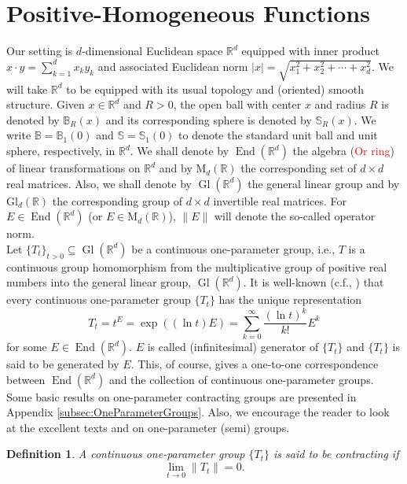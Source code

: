 \documentclass[11pt]{article}
\theoremstyle{theorem}
\newtheorem{definition}[theorem]{Definition}
\newcommand\MdR{\mbox{M}_d(\mathbb{R})} %
\newcommand\End{\operatorname{End}} %
\newcommand\GldR{\mbox{Gl}_d(\mathbb{R})}%
\newcommand\Gl{\operatorname{Gl}}                     %
\begin{document}
\section{Positive-Homogeneous Functions}

Our setting is $d$-dimensional Euclidean space $\mathbb{R}^d$ equipped with inner product $x\cdot y=\sum_{k=1}^dx_ky_k$ and associated Euclidean norm $|x|=\sqrt{x_1^2+x_2^2+\cdots+x_d^2}$. We will take $\mathbb{R}^d$ to be equipped with its usual topology and (oriented) smooth structure. Given $x\in\mathbb{R}^d$ and $R>0$, the open ball with center $x$ and radius $R$ is denoted by $\mathbb{B}_R(x)$ and its corresponding sphere is denoted by $\mathbb{S}_R(x)$. We write $\mathbb{B}=\mathbb{B}_1(0)$ and $\mathbb{S}=\mathbb{S}_1(0)$ to denote the standard unit ball and unit sphere, respectively, in $\mathbb{R}^d$. We shall denote by $\End(\mathbb{R}^d)$ the algebra (\textcolor{red}{Or ring}) of linear transformations on $\mathbb{R}^d$ and by $\MdR$ the corresponding set of $d\times d$ real matrices. Also, we shall denote by $\Gl(\mathbb{R}^d)$ the general linear group and by $\GldR$ the corresponding group of $d\times d$ invertible real matrices. For $E\in \End(\mathbb{R}^d)$ (or $E\in\MdR$), $\|E\|$ will denote the so-called operator norm.\\

\noindent Let $\{T_t\}_{t>0}\subseteq \Gl(\mathbb{R}^d)$ be a continuous one-parameter group, i.e., $T$ is a continuous group homomorphism from the multiplicative group of positive real numbers into the general linear group, $\Gl(\mathbb{R}^d)$. It is well-known (c.f., \cite{Randles2017,Engel2000,Engel2005}) that every continuous one-parameter group $\{T_t\}$ has the unique representation
\begin{equation*}
T_t=t^E=\exp((\ln t) E)=\sum_{k=0}^\infty \frac{(\ln t)^k}{k!}E^k
\end{equation*}
for some $E\in\End(\mathbb{R}^d)$. $E$ is called (infinitesimal) generator of $\{T_t\}$ and $\{T_t\}$ is said to be generated by $E$. This, of course, gives a one-to-one correspondence between $\End(\mathbb{R}^d)$ and the collection of continuous one-parameter groups. Some basic results on one-parameter contracting groups are presented in Appendix \ref{subsec:OneParameterGroups}. Also, we encourage the reader to look at the excellent texts \cite{Engel2005} and \cite{Engel2000} on one-parameter (semi) groups.

\begin{definition} A continuous one-parameter group $\{T_t\}$ is said to be \textit{contracting} if
\begin{equation*}
\lim_{t\to 0}\|T_t\|=0. 
\end{equation*}
\end{definition}
\end{document}

